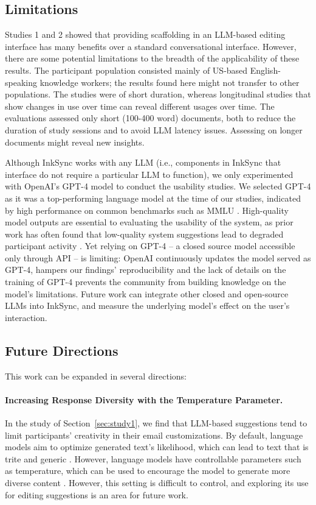 \documentclass[manuscript]{acmart}
\begin{document}
\subsection{Limitations} \label{sec:limitations}

Studies 1 and 2 showed that providing scaffolding in an LLM-based editing interface has many benefits over a standard conversational interface. However, there are some potential limitations to the breadth of the applicability of these results. The participant population consisted mainly of US-based English-speaking knowledge workers; the results found here might not transfer to other populations. The studies were of short duration, whereas longitudinal studies that show changes in use over time can reveal different usages over time. The evaluations assessed only short (100-400 word) documents, both to reduce the duration of study sessions and to avoid LLM latency issues. Assessing on longer documents might reveal new insights. 

Although InkSync works with any LLM (i.e., components in InkSync that interface do not require a particular LLM to function), we only experimented with OpenAI's GPT-4 model to conduct the usability studies. We selected GPT-4 as it was a top-performing language model at the time of our studies, indicated by high performance on common benchmarks such as MMLU \cite{hendrycks2020measuring}. High-quality model outputs are essential to evaluating the usability of the system, as prior work has often found that low-quality system suggestions lead to degraded participant activity \cite{clark2018creative}. Yet relying on GPT-4 -- a closed source model accessible only through API -- is limiting: OpenAI continuously updates the model served as GPT-4, hampers our findings' reproducibility and the lack of details on the training of GPT-4 prevents the community from building knowledge on the model's limitations. Future work can integrate other closed and open-source LLMs into InkSync, and measure the underlying model's effect on the user's interaction.


\subsection{Future Directions}

This work can be expanded in several directions:
\paragraph{Increasing Response Diversity with the Temperature Parameter.} In the study of Section~\ref{sec:study1}, we find that LLM-based suggestions tend to limit participants' creativity in their email customizations. By default, language models aim to optimize generated text's likelihood, which can lead to text that is trite and generic \cite{arnold2016suggesting}. However, language models have controllable parameters such as temperature, which can be used to encourage the model to generate more diverse content \cite{roemmele2018automated}. However, this setting is difficult to control, and exploring its use for editing suggestions is an area for future work.
\end{document}
